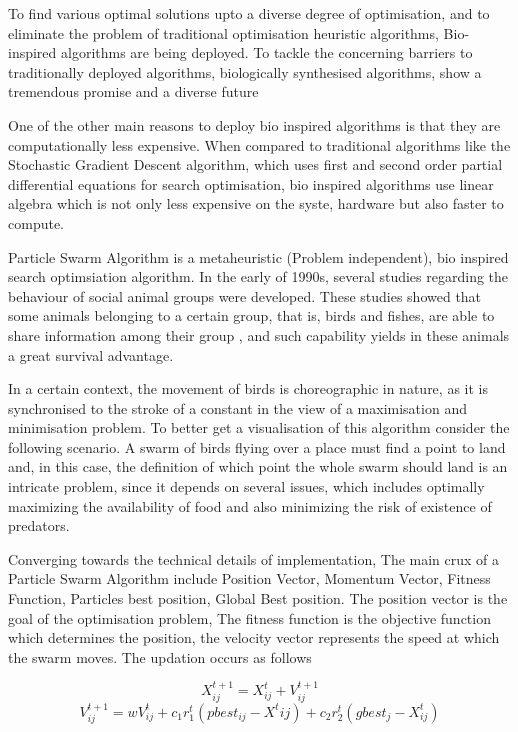 \documentclass[12pt]{article}
\newcommand{\nd}{\noindent}
\begin{document}
\nd To find various optimal solutions upto a diverse degree of optimisation, and to eliminate the problem of traditional optimisation heuristic algorithms, Bio-inspired algorithms are being deployed. To tackle the concerning barriers to traditionally deployed algorithms, biologically synthesised algorithms, show a tremendous promise and a diverse future 

\nd  One of the other main reasons to deploy bio inspired algorithms is that they are computationally less expensive. When compared to traditional algorithms like the Stochastic Gradient Descent algorithm, which uses first and second order partial differential equations for search optimisation, bio inspired algorithms use linear algebra which is not only less expensive on the syste, hardware but also faster to compute. 

\nd Particle Swarm Algorithm is a metaheuristic (Problem independent), bio inspired search optimsiation algorithm. In the early of 1990s, several studies regarding the behaviour of social animal groups were developed. These studies showed that some animals belonging to a certain group, that is, birds and fishes, are able to share information among their group , and such capability yields in these animals a great survival advantage.

\nd In a certain context, the movement of birds is choreographic in nature, as it is synchronised to the stroke of a constant in the view of a maximisation and minimisation problem. 
\newpage
\nd To better get a visualisation of this algorithm consider the following scenario. A swarm of birds flying over a place must find a point to land and, in this case, the definition of which point the whole swarm should land is an intricate problem, since it depends on several issues, which includes optimally maximizing the availability of food and also minimizing the risk of existence of predators.

\nd Converging towards the technical details of implementation, The main crux of a Particle Swarm Algorithm include Position Vector, Momentum Vector, Fitness Function, Particles best position, Global Best position. The position vector is the goal of the optimisation problem, The fitness function is the objective function which determines the position, the velocity vector represents the speed at which the swarm moves. The updation occurs as follows 

\begin{equation}
X^{t+1}_{ij}= X^{t}_{ij}+ V^{t+1}_{ij} 
\end{equation} 
\begin{equation}
V^{t+1}_{ij}= wV^{t}_{ij}+c_1 r^{t}_{1} (pbest_{ij}-X^{t}{ij})+c_2 r^{t}_{2}(gbest_j - X^{t}_{ij})
\end{equation} 
\end{document}
